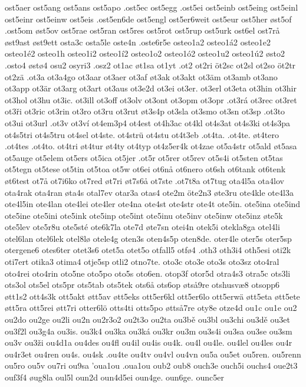 {{ost5aer
ost5ang
ost5ans
ost5apo
.ost5ec
ost5egg
.ost5ei
ost5einb
ost5eing
ost5einl
ost5einr
ost5einw
ost5eis
.ost5en6de
ost5engl
ost5er6weit
ost5eur
ost5her
øst5of
.ost5om
øst5ov
ost5rae
ost5ran
ost5res
ost5rot
ost5rup
ost5urk
ost6el
ost7rå
øst9ast
øst9ett
osta3c
osta5le
oste4n
.oste6r5e
osteo1a2
osteo1á2
osteo1e2
osteo1é2
osteo1h
osteo1i2
osteo1í2
osteo1o2
osteo1ó2
osteo1u2
osteo1ú2
østo2
.osto4
østø4
osu2
osyri3
.osz2
ot1ac
øt1sa
ot1yt
.ot2
ot2ri
öt2sc
ot2sl
ot2so
öt2tr
ot2zä
.ot3a
ot3a4go
ot3aar
ot3aer
ot3af
øt3ak
ot3akt
ot3äm
ot3amb
ot3ano
ot3app
ot3är
ot3arg
ot3art
ot3aus
ot3e2d
ot3ei
ot3er.
ot3erl
ot3eta
ot3hin
ot3hir
ot3hol
ot3hu
ot3ic.
ot3ill
ot3off
ot3olv
ot3ont
ot3opm
ot3opr
.ot3rá
ot3rec
ot3ret
ot3ři
ot3ric
ot3rin
ot3ro
ot3ru
ot3rut
øt3s4p
ot3sla
ot3smo
ot3sn
ot3sp
.ot3to
ot3ui
ot3url
.ot3v
ot3ví
ot4em3p4
ot4est
ot4h3ac
ot4kl
ot4s3at
ot4s3ki
ot4s3pa
ot4s5tri
ot4s5tru
ot4sel
ot4ste.
ot4strü
ot4stu
ot4t3eb
.ot4ta.
.ot4te.
øt4tero
.ot4tes
.ot4to.
ot4tri
øt4tur
øt4ty
ot4typ
ot4z5er4k
ot4zae
ot5a4str
ot5ald
øt5asa
ot5auge
ot5elem
ot5ers
ot5ica
ot5jer
.ot5r
ot5rer
ot5rev
ot5s4i
ot5sten
ot5tas
ot5tegn
ot5tese
ot5tin
ot5toa
ot5w
ot6ei
ot6nå
ot6nero
ot6sh
ot6tank
ot6tenk
øt6test
ot7å
ot7i6ko
ot7red
øt7ri
øt7s6å
ot7ste
.ot7t8a
ot7tug
ota4l5a
ota4lov
ota4rak
ota4ran
øta4s
otal7ev
otar3a
otas4
ote2m
öte2n3
øte3ru
ote4kle
ote4l3a
ote4l5in
ote4lan
ote4lei
ote4ler
ote4na
ote4st
ote4str
ote4t
ote5in.
ote5ina
ote5ind
ote5ine
ote5ini
ote5ink
ote5inp
ote5int
ote5inu
ote5inv
ote5inw
ote5inz
øte5k
ote5lev
ote5r8u
ote5sté
ote6k7la
ote7d
øte7sn
otei4n
otek5i
otekla8ga
otel4li
otel6lan
otel6lek
otel8lø
otele4g
oten3s
oten4s5p
oten8de.
oter4le
oter5s
oter5sp
otergene6
otes6ter
otet3s6
otet5a
otet5o
otfall5
otfø4
.oth3
oth3i4
oth5esi
oti2k
oti7ert
otika3
otima4
otje5sp
otli2
otno7te.
oto3c
oto3e
oto3s
oto3sz
oto4ral
oto4rei
oto4rin
oto5ne
oto5po
oto5s
oto6en.
otop3f
otor5d
otra4s3
otra5c
ots3li
ots3ol
ots5el
ots5pr
ots5tab
ots5tek
ots6å
ots6op
øtså9re
otshusvæ8
otsopp6
øtt1s2
ott4s3k
ott5akt
øtt5av
øtt5eks
ott5er6kl
ott5er6lo
ott5erwä
øtt5eta
øtt5ete
øtt5ra
ott5rei
øtt7ri
otter6lö
otts4ti
otts5po
øttså7re
oty8e
otze4d
ou1c
ou1e
ou2
ou2do
ou2ge
ou2li
ou2n
ou2r3o2
ou2t3o
ou2ta
ou3bě
ou3bl
ou3chi
ou3dě
ou3et
ou3f2l
ou3g4a
ou3is.
ou3k4
ou3ka
ou3ká
ou3kr
ou3m
ou3s4i
ou3sa
ou3se
ou3sm
ou3v
ou3ži
ou4d1a
ou4des
ou4fl
ou4il
ou4is
ou4k.
ou4l
ou4le.
ou4lel
ou4les
ou4r
ou4r3et
ou4ren
ou4s.
ou4sk
.ou4te
ou4tv
ou4vl
ou4vn
ou5a
ou5et
ou5ren.
ou5renn
ou5ro
ou5v
ou7ri
ou9sa
'oua1ou
.oua1ou
oub2
oub8
ouch3e
ouch5i
ouchs4
oue2t3
ouf3f4
øug8la
oul5l
oun2d
oun4d5ei
oun4ge.
oun6ge.
ounc5er
}}
